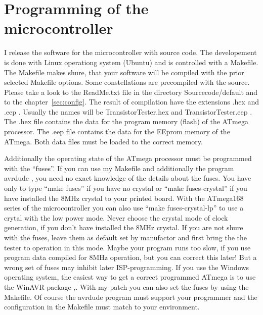 \section{Programming of the microcontroller}
I release the software for the microcontroller with source code.
The developement is done with Linux operationg system (Ubuntu) and
is controlled with a Makefile. The Makefile makes shure, that your
software will be compiled with the prior selected Makefile options. Some constellations
are precompiled with the source. Please take a look to the ReadMe.txt file
in the directory Sourcecode/default and to the chapter~\ref{sec:config}.
The result of compilation have the extensions .hex and .eep .
Usually the names will be TransistorTester.hex and TransistorTester.eep .
The .hex file contains the data for the program memory (flash) of the ATmega processor.
The .eep file contains the data for the EEprom memory of the ATmega. Both data files
must be loaded to the correct memory.

Additionally the operating state of the
ATmega processor must be programmed with the ``fuses''.
If you can use my Makefile and additionally the program avrdude \cite{avrdude}, you need no exact
knowledge of the details about the fuses. You have only to type ``make fuses'' if you
have no crystal or ``make fuses-crystal'' if you have installed the 8MHz crystal to your printed board.
With the ATmega168 series of the microcontroller you can also use ``make fuses-crystal-lp'' to use
a crytal with the low power mode.
Never choose the crystal mode of clock generation, if you don't have installed
the 8MHz crystal. If you are not shure with the fuses, leave them as default
set by manufactor and first bring the the tester to operation in this mode.
Maybe your program runs too slow, if you use program data compiled for
8MHz operation, but you can correct this later! But a wrong set of fuses may inhibit
later ISP-programming.
If you use the Windows operating system, the easiest way to get a correct programmed
ATmega is to use the WinAVR package \cite{winavr1},\cite{winavr2}.
With my patch \cite{winavr3} you can also set the fuses by using the Makefile.
Of course the avrdude program must support your programmer and the configuration
in the Makefile must match to your environment.


